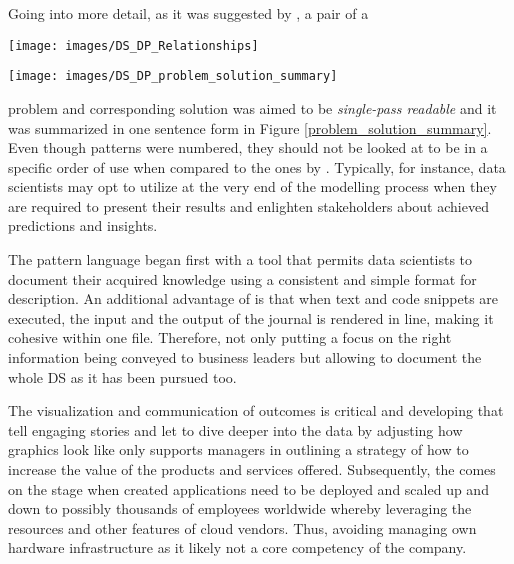 Going into more detail, as it was suggested by \textcite{DobleMeszaros1997}, a pair of a

\noindent\begin{minipage}{\linewidth}
\centering
\texttt{[image: images/DS\_DP\_Relationships]}
\label{problem_solution_relationships}

\texttt{[image: images/DS\_DP\_problem\_solution\_summary]}
\label{problem_solution_summary}
\end{minipage} 
problem and corresponding solution was aimed to be \emph{single-pass readable} and it was summarized in one sentence form in Figure \ref{problem_solution_summary}.
Even though patterns were numbered, they should not be looked at to be in a specific order of use when compared to the ones by \textcite{Alexander1977}. 
Typically, for instance, data scientists may opt to utilize  at the very end of the modelling process when they are required to present their results and enlighten stakeholders about achieved predictions and insights. 

The pattern language began first with a tool that permits data scientists to document their acquired knowledge using a consistent and simple format for description. 
An additional advantage of  is that when text and code snippets are executed, the input and the output of the journal is rendered in line, making it cohesive within one file. 
Therefore, not only putting a focus on the right information being conveyed to business leaders but allowing to document the whole \ac{DS} as it has been pursued too. 

The visualization and communication of outcomes is critical and developing  that tell engaging stories and let to dive deeper into the data by adjusting how graphics look like only supports managers in outlining a strategy of how to increase the value of the products and services offered. 
Subsequently, the  comes on the stage when created applications need to be deployed and scaled up and down to possibly thousands of employees worldwide whereby leveraging the resources and other features of cloud vendors. 
Thus, avoiding managing own hardware infrastructure as it likely not a core competency of the company.

